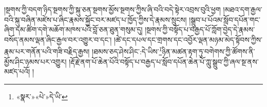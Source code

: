 །སྔགས་ཀྱི་བདག་ཉིད་སྔགས་ཀྱི་སྐུ་ཅན་སྔགས་མྱོས་སྔགས་ཀྱིས་ཞི་བའི་བདེ་སྟེར་འབྲས་བུའི་ཕྱག །མཐའ་དག་རྒྱལ་བའི་སྐུ་བཞིན་མཛེས་པ་ཞིང་རྣམས་སྐྱོང་བར་མཛད་པ་ཁྱོད་ཀྱིས་དེ་རྣམས་སྲུངས། །སྒྲུབ་པ་པོའམ་སློབ་དཔོན་གང་ཞིག་དམ་ཚིག་དགེ་མཆོག་མཁས་པའི་བློ་ཅན་ཐུན་གསུམ་དུ། །སྔགས་ཀྱི་བསྟོད་པ་བརྒྱད་པོ་ཀློག་བྱེད་དེ་རྣམས་བསོད་ནམས་ལྡན་ཞིང་རྒྱལ་བར་འགྱུར་བ་དང་། །ཚེ་དང་དཔལ་དང་གྲགས་དང་འབྱོར་ལྡན་མཉམ་མེད་སྟོབས་ཀྱིས་རྣམ་པར་གནོན་པའི་གཟི་བརྗིད་རྒྱས། །ཐམས་ཅད་ཤེས་ཤིང་:དེ་ཡིས་\footnote{«སྣར་»«པེ་»དེ་ཡི་}ཉིན་མཚན་རྟག་ཏུ་བགེགས་ཀྱི་ཚོགས་ནི་མྱོས་ཤིང་ཉམས་པར་འགྱུར། །རྡོ་རྗེ་ནག་པོ་ཆེན་པོའི་བསྟོད་པ་བརྒྱད་པ་སློབ་དཔོན་ཆེན་པོ་ཀླུ་སྒྲུབ་ཀྱི་ཞལ་སྔ་ནས་མཛད་པའོ། ། 